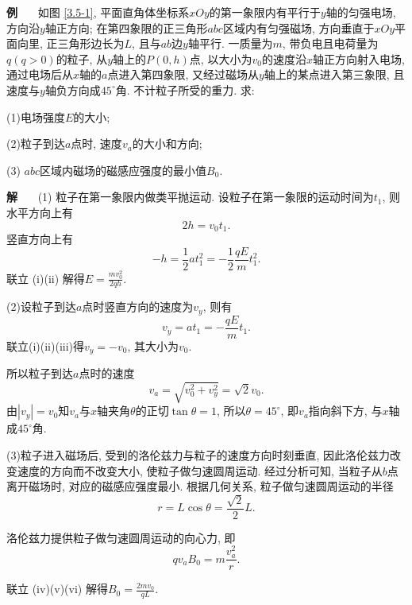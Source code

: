 \documentclass[11pt,a4paper]{ctexbook}
\newcounter{exam}[chapter]
\newcommand{\bre}{\ \ \ }
\newcommand{\examlabel}{\textbf{例\theexam}}
\newcommand{\soln}{\textbf{解}\bre}
\newenvironment{example}{\bigskip\par\refstepcounter{exam}\examlabel\bre}{\par}
\newenvironment{solution}{\par\soln}{\par\bigskip}
\begin{document}
\begin{example}
    \label{例题匀强电场磁场}
    如图 \ref{3.5-1}, 平面直角体坐标系$xOy$的第一象限内有平行于$y$轴的匀强电场,
    方向沿$y$轴正方向; 在第四象限的正三角形$abc$区域内有匀强磁场,
    方向垂直于$xOy$平面向里, 正三角形边长为$L$, 且与$ab$边$y$轴平行.
    一质量为$m$, 带负电且电荷量为$q(q>0)$的粒子, 从$y$轴上的$P(0, h)$点,
    以大小为$v_0$的速度沿$x$轴正方向射入电场, 通过电场后从$x$轴的$a$点进入第四象限,
    又经过磁场从$y$轴上的某点进入第三象限, 且速度与$y$轴负方向成$45^{\circ}$角.
    不计粒子所受的重力. 求:

    (1)电场强度$E$的大小;

    (2)粒子到达$a$点时, 速度$v_a$的大小和方向;

    (3) $abc$区域内磁场的磁感应强度的最小值$B_0$.

\end{example}
\begin{solution}
    (1) 粒子在第一象限内做类平抛运动. 设粒子在第一象限的运动时间为$t_1$, 则水平方向上有
    \begin{equation*}
        2h = v_0t_1.\tag{i}
    \end{equation*}
    竖直方向上有
    \begin{equation*}
        -h = \frac12 at_1^2 = -\frac12\frac{qE}{m}t_1^2.\tag{ii}
    \end{equation*}
    联立 (i)(ii) 解得$E = \displaystyle\frac{mv_0^2}{2qh}.$

    (2)设粒子到达$a$点时竖直方向的速度为$v_y$, 则有
    \begin{equation*}
        v_y = at_1 = -\frac{qE}{m}t_1.\tag{iii}
    \end{equation*}
    联立(i)(ii)(iii)得$v_y = -v_0$, 其大小为$v_0$.

    所以粒子到达$a$点时的速度
    \begin{equation*}
        v_a = \sqrt{v_0^2 +v_y^2} = \sqrt{2}v_0.\tag{iv}
    \end{equation*}
    由$|v_y|=v_0$知$v_a$与$x$轴夹角$\theta$的正切$\tan\theta = 1$, 所以$\theta = 45^{\circ}$,
    即$v_a$指向斜下方, 与$x$轴成$45^{\circ}$角.

    (3)粒子进入磁场后, 受到的洛伦兹力与粒子的速度方向时刻垂直, 因此洛伦兹力改变速度的方向而不改变大小,
    使粒子做匀速圆周运动. 经过分析可知, 当粒子从$b$点离开磁场时, 对应的磁感应强度最小.
    根据几何关系, 粒子做匀速圆周运动的半径
    \begin{equation*}
        r = L\cos\theta = \frac{\sqrt{2}}{2}L.\tag{v}
    \end{equation*}

    洛伦兹力提供粒子做匀速圆周运动的向心力, 即
    \begin{equation*}
        qv_aB_0 = m\frac{v_a^2}{r}.\tag{vi}
    \end{equation*}

    联立 (iv)(v)(vi) 解得$B_0 = \displaystyle\frac{2mv_0}{qL}.$

\end{solution}
\end{document}
